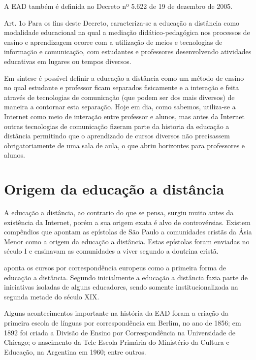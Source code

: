\documentclass[
	12pt,				%
	openright,			%
	oneside,			%
	a4paper,			%
	english,			%
	french,				%
	spanish,			%
	brazil				%
	]{abntex2}
\begin{document}
 A EAD também é definida no Decreto nº 5.622 de 19 de dezembro de 2005\cite{BRASIL2005}.
 \begin{citacao}
 	Art. 1o  Para os fins deste Decreto, caracteriza-se a educação a distância como modalidade educacional na qual a mediação didático-pedagógica nos processos de ensino e aprendizagem ocorre com a utilização de meios e tecnologias de informação e comunicação, com estudantes e professores desenvolvendo atividades educativas em lugares ou tempos diversos\cite{BRASIL2005}.
 \end{citacao}
 
Em síntese é possível definir a educação a distância como um método de ensino no qual estudante e professor ficam separados fisicamente e a interação e feita através de tecnologias de comunicação (que podem ser dos mais diversos) de maneira a contornar esta separação. Hoje em dia, como sabemos, utiliza-se a Internet como meio de interação entre professor e alunos, mas antes da Internet outras tecnologias de comunicação fizeram parte da historia da educação a distância permitindo que o aprendizado de cursos diversos não precisassem obrigatoriamente de uma sala de aula, o que abriu horizontes para professores e alunos.

\section{Origem da educação a distância}
A educação a distância, ao contrario do que se pensa, surgiu muito antes da existência da Internet, porém a sua origem exata é alvo de controvérsias. Existem compêndios que apontam as epístolas de São Paulo a comunidades cristãs da Ásia Menor como a origem da educação a distância. Estas epístolas foram enviadas no século I e ensinavam as comunidades a viver segundo a doutrina cristã\cite{gouvea2006}.

 aponta os cursos por correspondência europeus como a primeira forma de educação a distância.
Segundo  inicialmente a educação a distância fazia parte de iniciativas isoladas de alguns educadores, sendo somente institucionalizada na segunda metade do século XIX.

Alguns acontecimentos importante na história da EAD foram a criação da primeira escola de línguas por correspondência em Berlim, no ano de 1856; em 1892 foi criada a Divisão de Ensino por Correspondência na Universidade de Chicago; o nascimento da Tele Escola Primária do Ministério da Cultura e Educação, na Argentina em 1960; entre outros\cite{Alves2011}.
\end{document}
